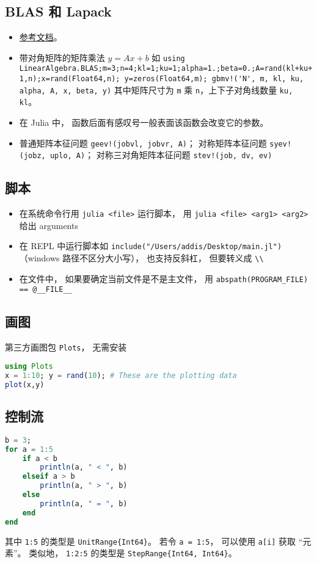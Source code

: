 \subsection{BLAS 和 Lapack}
\begin{itemize}
\item \href{https://docs.julialang.org/en/v1/stdlib/LinearAlgebra/}{参考文档}。
\item 带对角矩阵的矩阵乘法 $y = Ax+b$ 如 \verb|using LinearAlgebra.BLAS;m=3;n=4;kl=1;ku=1;alpha=1.;beta=0.;A=rand(kl+ku+1,n);x=rand(Float64,n); y=zeros(Float64,m); gbmv!('N', m, kl, ku, alpha, A, x, beta, y)| 其中矩阵尺寸为 \verb|m| 乘 \verb|n|，上下子对角线数量 \verb|ku, kl|。
\item 在 Julia 中， 函数后面有感叹号一般表面该函数会改变它的参数。
\item 普通矩阵本征问题 \verb|geev!(jobvl, jobvr, A)|； 对称矩阵本征问题 \verb|syev!(jobz, uplo, A)|； 对称三对角矩阵本征问题 \verb|stev!(job, dv, ev)|
\end{itemize}

\subsection{脚本}
\begin{itemize}
\item 在系统命令行用 \verb|julia <file>| 运行脚本， 用 \verb|julia <file> <arg1> <arg2>| 给出 arguments
\item 在 REPL 中运行脚本如 \verb|include("/Users/addis/Desktop/main.jl")|（windows 路径不区分大小写）， 也支持反斜杠， 但要转义成 \verb|\\|
\item 在文件中， 如果要确定当前文件是不是主文件， 用 \verb|abspath(PROGRAM_FILE) == @__FILE__|
\end{itemize}

\subsection{画图}
第三方画图包 \verb|Plots|， 无需安装
\begin{lstlisting}[language=Julia]
using Plots
x = 1:10; y = rand(10); # These are the plotting data
plot(x,y)
\end{lstlisting}

\subsection{控制流}
\begin{lstlisting}[language=Julia]
b = 3;
for a = 1:5
    if a < b
        println(a, " < ", b)
    elseif a > b
        println(a, " > ", b)
    else
        println(a, " = ", b)
    end
end
\end{lstlisting}
其中 \verb|1:5| 的类型是 \verb|UnitRange{Int64}|。 若令 \verb|a = 1:5|， 可以使用 \verb|a[i]| 获取 “元素”。 类似地， \verb|1:2:5| 的类型是 \verb|StepRange{Int64, Int64}|。

